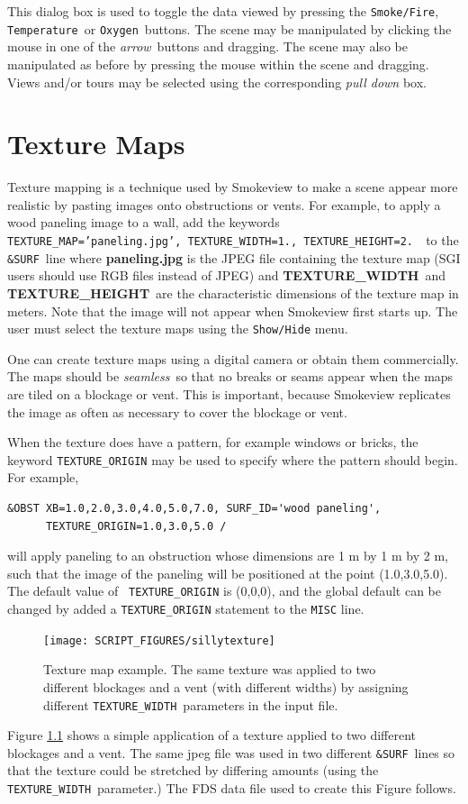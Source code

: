 \documentclass[11pt,twoside]{book}
\newcommand{\figoptions}{hbp}
\begin{document}
This dialog box is used to toggle the data viewed by pressing the {\tt Smoke/Fire},
{\tt Temperature}\ or {\tt Oxygen}\ buttons.  The scene may be manipulated by clicking the mouse in one of the
{\em arrow}\ buttons and dragging.  The scene may also
be manipulated as before by pressing the mouse within the scene and dragging.  Views and/or tours may be selected
using the corresponding {\em pull down} box.

\chapter{Texture Maps} Texture mapping is a technique used by
Smokeview to make a scene appear more realistic by pasting images
onto obstructions or vents. For example, to apply a wood paneling
image to a wall, add the keywords {\tt
TEXTURE\_MAP='paneling.jpg', TEXTURE\_WIDTH=1., TEXTURE\_HEIGHT=2.
}\ to the {\tt \&SURF}\ line where {\bf paneling.jpg} is the JPEG
file containing the texture map (SGI users should use RGB files
instead of JPEG) and {\bf TEXTURE\_WIDTH}\ and {\bf
TEXTURE\_HEIGHT}\ are the characteristic dimensions of the texture
map in meters. Note that the image will not appear when Smokeview
first starts up. The user must select the texture maps using the
{\tt Show/Hide} menu.

One can create texture maps using a digital camera or obtain them
commercially.  The maps should be {\em seamless}\ so that no
breaks or seams appear when the maps are tiled on a blockage or
vent.  This is important, because Smokeview replicates the image
as often as necessary to cover the blockage or vent.

When the texture does have a pattern, for example windows or
bricks, the keyword {\tt TEXTURE\_ORIGIN} may be used to specify
where the pattern should begin.  For example,
\begin{verbatim}
&OBST XB=1.0,2.0,3.0,4.0,5.0,7.0, SURF_ID='wood paneling',
      TEXTURE_ORIGIN=1.0,3.0,5.0 /
\end{verbatim}
\noindent will apply paneling to an obstruction whose dimensions
are 1 m by 1 m by 2 m, such that the image of the paneling will be
positioned at the point (1.0,3.0,5.0). The default value of {\tt
TEXTURE\_ORIGIN} is (0,0,0), and the global default can be changed
by added a {\tt TEXTURE\_ORIGIN} statement to the {\tt MISC} line.

\begin{figure}[\figoptions]
\centerline{\texttt{[image: SCRIPT\_FIGURES/sillytexture]}
} \caption [Texture map example.] {
Texture map example.  The same texture was applied to two different
blockages and a vent (with different widths) by assigning different {\tt TEXTURE\_WIDTH}\
parameters in the input file.
} \label{figTextures}
\end{figure}
Figure \ref{figTextures} shows a simple application of a texture
applied to two different blockages and a vent.  The same jpeg file
was used in two different {\tt \&SURF}\ lines so that the texture
could be stretched by differing amounts (using the {\tt
TEXTURE\_WIDTH}\ parameter.)  The FDS data file used to create
this Figure follows.
\end{document}
